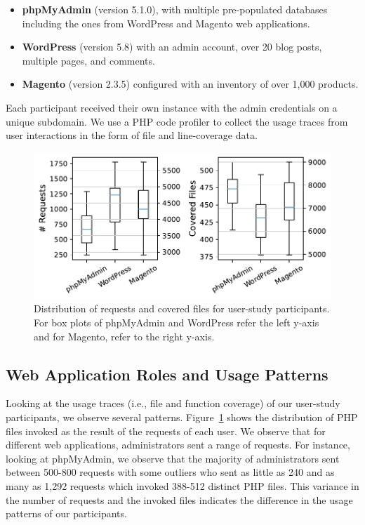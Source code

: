 \begin{itemize}
    \item \textbf{phpMyAdmin} (version 5.1.0), with multiple pre-populated databases including the ones from WordPress and Magento web applications.
    \item \textbf{WordPress} (version 5.8) with an admin account, over 20 blog posts, multiple pages, and comments. 
    \item \textbf{Magento} (version 2.3.5) configured with an inventory of over 1,000 products. 
\end{itemize}

Each participant received their own instance with the admin credentials on a unique subdomain. 
We use a PHP code profiler to collect the usage traces from user interactions in the form of file and line-coverage data. 

\begin{figure}[t]
    \centering
    \includegraphics[width=\linewidth]{figures/dbltr/userstudy_boxplots.pdf}
    \caption{Distribution of requests and covered files for user-study participants. For box plots of phpMyAdmin and WordPress refer the left y-axis and for Magento, refer to the right y-axis.}
	\label{fig:userstudystats}
\end{figure}

\subsection{Web Application Roles and Usage Patterns}

Looking at the usage traces (i.e., file and function coverage) of our user-study participants, we observe several patterns. 
Figure~\ref{fig:userstudystats} shows the distribution of PHP files invoked as the result of the requests of each user. 
We observe that for different web applications, administrators sent a range of requests. 
For instance, looking at phpMyAdmin, we observe that the majority of administrators sent between 500-800 requests with some outliers who sent as little as 240 and as many as 1,292 requests which invoked 388-512 distinct PHP files. 
This variance in the number of requests and the invoked files indicates the difference in the usage patterns of our participants. 


